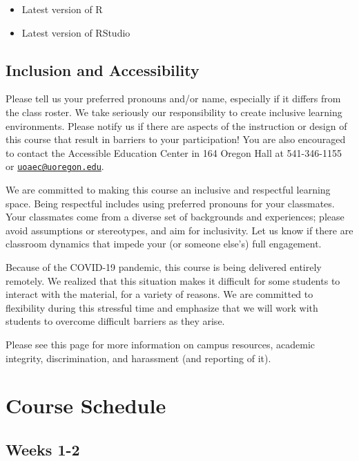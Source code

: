 \documentclass[]{book}
\begin{document}
\begin{itemize}
\item
  Latest version of R
\item
  Latest version of RStudio
\end{itemize}

\hypertarget{inclusion-and-accessibility}{%
\section{Inclusion and Accessibility}\label{inclusion-and-accessibility}}

Please tell us your preferred pronouns and/or name, especially if it differs from the class roster. We take seriously our responsibility to create inclusive learning environments. Please notify us if there are aspects of the instruction or design of this course that result in barriers to your participation! You are also encouraged to contact the Accessible Education Center in 164 Oregon Hall at 541-346-1155 or \href{mailto:uoaec@uoregon.edu}{\nolinkurl{uoaec@uoregon.edu}}.

We are committed to making this course an inclusive and respectful learning space. Being respectful includes using preferred pronouns for your classmates. Your classmates come from a diverse set of backgrounds and experiences; please avoid assumptions or stereotypes, and aim for inclusivity. Let us know if there are classroom dynamics that impede your (or someone else's) full engagement.

Because of the COVID-19 pandemic, this course is being delivered entirely remotely. We realized that this situation makes it difficult for some students to interact with the material, for a variety of reasons. We are committed to flexibility during this stressful time and emphasize that we will work with students to overcome difficult barriers as they arise.

Please see this page for more information on campus resources, academic integrity, discrimination, and harassment (and reporting of it).

\hypertarget{course-schedule}{%
\chapter{Course Schedule}\label{course-schedule}}

\hypertarget{weeks-1-2}{%
\section{Weeks 1-2}\label{weeks-1-2}}
\end{document}
